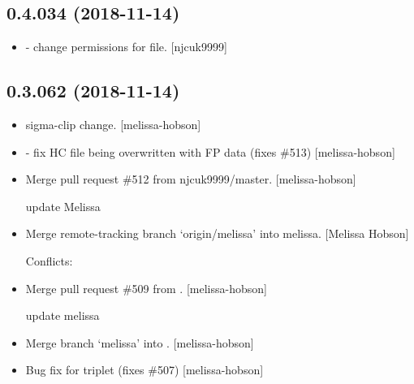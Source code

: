 \documentclass[a4paper,10pt,english]{report}
\begin{document}
\subsection{0.4.034 (2018-11-14)}
\label{\detokenize{misc/changelog:id260}}\begin{itemize}
\item {} 
 - change permissions for file. {[}njcuk9999{]}

\end{itemize}


\subsection{0.3.062 (2018-11-14)}
\label{\detokenize{misc/changelog:id261}}\begin{itemize}
\item {} 
 sigma-clip change. {[}melissa-hobson{]}

\item {} 
 - fix HC file being overwritten with FP data (fixes
\#513) {[}melissa-hobson{]}

\item {} 
Merge pull request \#512 from njcuk9999/master. {[}melissa-hobson{]}

update Melissa

\item {} 
Merge remote-tracking branch ‘origin/melissa’ into melissa. {[}Melissa
Hobson{]}
\begin{description}
\item[{Conflicts:}] \leavevmode
{}

\end{description}

\item {} 
Merge pull request \#509 from . {[}melissa-hobson{]}

update melissa

\item {} 
Merge branch ‘melissa’ into . {[}melissa-hobson{]}

\item {} 
Bug fix for  triplet (fixes \#507) {[}melissa-hobson{]}

\end{itemize}
\end{document}
